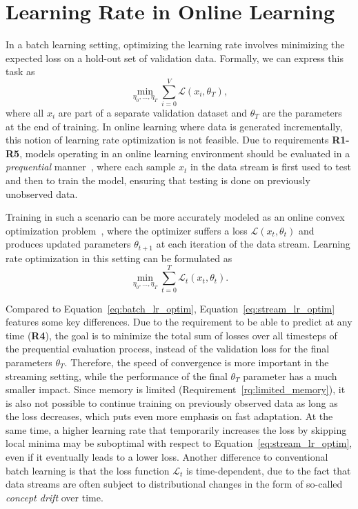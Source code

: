\documentclass[runningheads]{llncs}
\begin{document}
\section{Learning Rate in Online Learning}

In a batch learning setting, optimizing the learning rate involves minimizing the expected loss on a hold-out set of validation data.
Formally, we can express this task as
\begin{equation}
	\label{eq:batch_lr_optim}
	\min_{\eta_0, \ldots, \eta_T} \sum_{i=0}^V \mathcal{L}(x_i, \theta_T),
\end{equation}
where all $x_i$ are part of a separate validation dataset and $\theta_T$ are the parameters at the end of training.
In online learning where data is generated incrementally, this notion of learning rate optimization is not feasible.
Due to requirements \textbf{R1-R5}, models operating in an online learning environment should be evaluated in a \textit{prequential} manner~\cite{bifetMOAMassiveOnline2010}, where each sample $x_t$ in the data stream is first used to test and then to train the model, ensuring that testing is done on previously unobserved data.

Training in such a scenario can be more accurately modeled as an online convex optimization problem~\cite{shalev-shwartzOnlineLearningOnline2011,hazanIntroductionOnlineConvex2016}, where the optimizer suffers a loss $\mathcal{L}(x_t, \theta_{t})$ and produces updated parameters $\theta_{t+1}$ at each iteration of the data stream.
Learning rate optimization in this setting can be formulated as
\begin{equation}
	\label{eq:stream_lr_optim}
	\min_{\eta_0, \ldots, \eta_T} \sum_{t=0}^{T} \mathcal{L}_t(x_t,\theta_t).
\end{equation}

Compared to Equation~\eqref{eq:batch_lr_optim}, Equation~\eqref{eq:stream_lr_optim} features some key differences.
Due to the requirement to be able to predict at any time (\textbf{R4}), the goal is to minimize the total sum of losses over all timesteps of the prequential evaluation process, instead of the validation loss for the final parameters $\theta_T$.
Therefore, the speed of convergence is more important in the streaming setting, while the performance of the final $\theta_T$ parameter has a much smaller impact.
Since memory is limited (Requirement~\ref{rq:limited_memory}), it is also not possible to continue training on previously observed data as long as the loss decreases, which puts even more emphasis on fast adaptation.
At the same time, a higher learning rate that temporarily increases the loss by skipping local minima may be suboptimal with respect to Equation~\eqref{eq:stream_lr_optim}, even if it eventually leads to a lower loss.
Another difference to conventional batch learning is that the loss function $\mathcal{L}_t$ is time-dependent, due to the fact that data streams are often subject to distributional changes in the form of so-called \textit{concept drift} over time.
\end{document}

